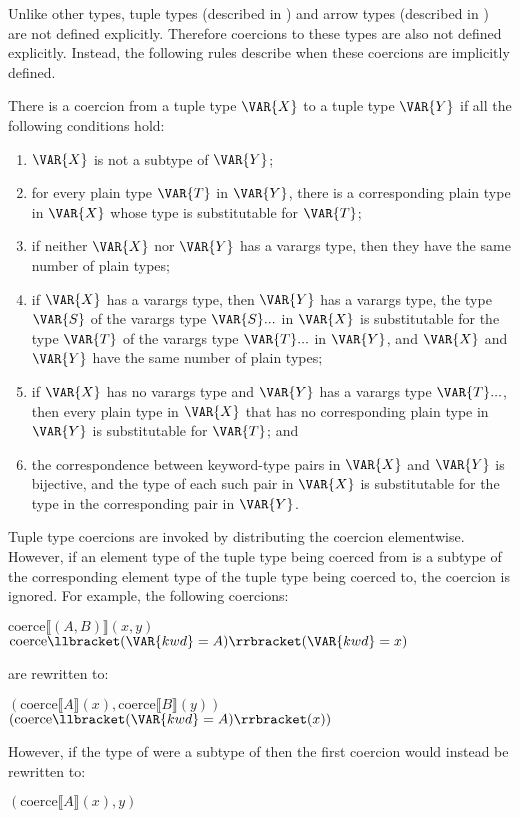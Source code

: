 Unlike other types, tuple types (described in ) and
arrow types (described in ) are
not defined explicitly.  Therefore coercions to these types are also
not defined explicitly.  Instead, the following rules describe when
these coercions are implicitly defined.

There is a coercion from a tuple type $\VAR{X}$ to a tuple type
$\VAR{Y}$ if all the following conditions hold:
\begin{enumerate}
\item
$\VAR{X}$ is not a subtype of $\VAR{Y}$;
\item
for every plain type $\VAR{T}$ in $\VAR{Y}$, there is a corresponding
plain type in $\VAR{X}$ whose type is substitutable for $\VAR{T}$;
\item
if neither $\VAR{X}$ nor $\VAR{Y}$ has a varargs type, then they have
the same number of plain types;
\item
if $\VAR{X}$ has a varargs type, then $\VAR{Y}$ has a varargs type,
the type $\VAR{S}$ of the varargs type $\VAR{S}...$ in $\VAR{X}$ is
substitutable for the type $\VAR{T}$ of the varargs type
$\VAR{T}...$ in $\VAR{Y}$, and $\VAR{X}$ and $\VAR{Y}$ have the same
number of plain types;
\item
if $\VAR{X}$ has no varargs type and $\VAR{Y}$ has a varargs type
$\VAR{T}...$, then every plain type in $\VAR{X}$ that has no
corresponding plain type in $\VAR{Y}$ is substitutable for $\VAR{T}$; and
\item
the correspondence between keyword-type pairs in $\VAR{X}$ and
$\VAR{Y}$ is bijective, and the type of each such pair in $\VAR{X}$ is
substitutable for the type in the corresponding pair in $\VAR{Y}$.
\end{enumerate}

Tuple type coercions are invoked by distributing the coercion
elementwise.  However, if an element type of the tuple type being coerced
from is a subtype of the corresponding element type of the tuple type being
coerced to, the coercion is ignored.  For example, the following coercions:
\begin{Fortress}
\(\mathrm{coerce}\llbracket(A, B)\rrbracket(x, y)\)\\
\(\mathrm{coerce}\llbracket(\VAR{kwd}=A)\rrbracket(\VAR{kwd}=x)\)
\end{Fortress}
are rewritten to:
\begin{Fortress}
\((\mathrm{coerce}\llbracket{}A\rrbracket(x), \mathrm{coerce}\llbracket{}B\rrbracket(y))\)\\
\((\mathrm{coerce}\llbracket(\VAR{kwd}=A)\rrbracket(x))\)
\end{Fortress}
However, if the type of  were a subtype of  then the
first coercion would instead be rewritten to:
\begin{Fortress}
\((\mathrm{coerce}\llbracket{}A\rrbracket(x), y)\)
\end{Fortress}

